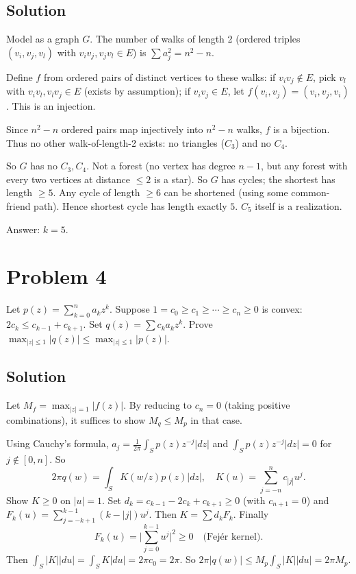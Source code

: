 \documentclass{article}
\begin{document}
\subsection*{Solution}
Model as a graph $G$. The number of walks of length 2 (ordered triples $(v_i, v_j, v_l)$ with $v_i v_j, v_j v_l \in E$) is $\sum a_j^2 = n^2 - n$.

Define $f$ from ordered pairs of distinct vertices to these walks: if $v_i v_j \notin E$, pick $v_l$ with $v_i v_l, v_l v_j \in E$ (exists by assumption); if $v_i v_j \in E$, let $f(v_i, v_j) = (v_i, v_j, v_i)$. This is an injection.

Since $n^2 - n$ ordered pairs map injectively into $n^2 - n$ walks, $f$ is a bijection. Thus no other walk-of-length-2 exists: no triangles ($C_3$) and no $C_4$.

So $G$ has no $C_3, C_4$. Not a forest (no vertex has degree $n - 1$, but any forest with every two vertices at distance $\le 2$ is a star). So $G$ has cycles; the shortest has length $\ge 5$. Any cycle of length $\ge 6$ can be shortened (using some common-friend path). Hence shortest cycle has length exactly $5$. $C_5$ itself is a realization.

Answer: $k = 5$.

\section*{Problem 4}
Let $p(z) = \sum_{k=0}^n a_k z^k$. Suppose $1 = c_0 \ge c_1 \ge \cdots \ge c_n \ge 0$ is convex: $2c_k \le c_{k-1} + c_{k+1}$. Set $q(z) = \sum c_k a_k z^k$. Prove $\max_{|z| \le 1} |q(z)| \le \max_{|z| \le 1} |p(z)|$.

\subsection*{Solution}
Let $M_f = \max_{|z| = 1} |f(z)|$. By reducing to $c_n = 0$ (taking positive combinations), it suffices to show $M_q \le M_p$ in that case.

Using Cauchy's formula, $a_j = \frac{1}{2\pi} \int_S p(z) z^{-j} |dz|$ and $\int_S p(z) z^{-j} |dz| = 0$ for $j \notin [0, n]$. So
\[
2\pi q(w) = \int_S K(w/z) p(z) |dz|, \quad K(u) = \sum_{j=-n}^n c_{|j|} u^j.
\]
Show $K \ge 0$ on $|u| = 1$. Set $d_k = c_{k-1} - 2 c_k + c_{k+1} \ge 0$ (with $c_{n+1} = 0$) and $F_k(u) = \sum_{j=-k+1}^{k-1}(k - |j|) u^j$. Then $K = \sum d_k F_k$. Finally
\[
F_k(u) = \biggl|\sum_{j=0}^{k-1} u^j\biggr|^2 \ge 0 \quad \text{(Fejér kernel)}.
\]
Then $\int_S |K| |du| = \int_S K |du| = 2\pi c_0 = 2\pi$. So $2\pi |q(w)| \le M_p \int_S |K| |du| = 2\pi M_p$.
\end{document}
